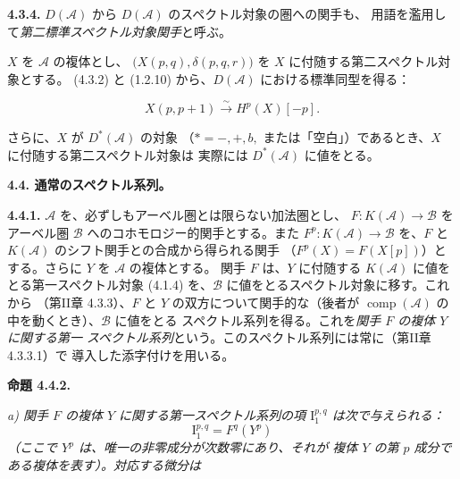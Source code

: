 \clearpage
{}%
\begingroup\small\setlength{\parskip}{0pt}\setlength{\emergencystretch}{1.5em}
\setlength{\abovedisplayskip}{4pt plus 2pt minus 2pt}%
\setlength{\belowdisplayskip}{4pt plus 2pt minus 2pt}%

\noindent\textbf{4.3.4.}\quad
$D(\mathcal A)$ から $D(\mathcal A)$ のスペクトル対象の圏への関手も、
用語を濫用して\emph{第二標準スペクトル対象関手}と呼ぶ。

$X$ を $\mathcal A$ の複体とし、
$\bigl(X(p,q),\delta(p,q,r)\bigr)$ を $X$ に付随する第二スペクトル対象とする。
(4.3.2) と (1.2.10) から、$D(\mathcal A)$ における標準同型を得る：

\begin{equation}
X(p,p+1)\xrightarrow{\sim}H^p(X)[-p].
\tag{4.3.4.1}
\end{equation}

さらに、$X$ が $D^*(\mathcal A)$ の対象
（$*=-,+,b,$ または「空白」）であるとき、$X$ に付随する第二スペクトル対象は
実際には $D^*(\mathcal A)$ に値をとる。

\medskip\noindent\textbf{4.4. 通常のスペクトル系列。}

\noindent\textbf{4.4.1.}\quad
$\mathcal A$ を、必ずしもアーベル圏とは限らない加法圏とし、
$F\colon K(\mathcal A)\longrightarrow\mathcal B$ をアーベル圏
$\mathcal B$ へのコホモロジー的関手とする。また
$F^p\colon K(\mathcal A)\longrightarrow\mathcal B$ を、$F$ と
$K(\mathcal A)$ のシフト関手との合成から得られる関手
（$F^p(X)=F(X[p])$）とする。さらに $Y$ を $\mathcal A$ の複体とする。
関手 $F$ は、$Y$ に付随する $K(\mathcal A)$ に値をとる第一スペクトル対象
(4.1.4) を、$\mathcal B$ に値をとるスペクトル対象に移す。これから
（第II章 4.3.3）、$F$ と $Y$ の双方について関手的な（後者が
$\operatorname{comp}(\mathcal A)$ の中を動くとき）、$\mathcal B$ に値をとる
スペクトル系列を得る。これを\emph{関手 $F$ の複体 $Y$ に関する第一
スペクトル系列}という。このスペクトル系列には常に（第II章 4.3.3.1）で
導入した添字付けを用いる。

\medskip\noindent\textbf{命題 4.4.2.}\quad

\noindent\textit{a) 関手 $F$ の複体 $Y$ に関する第一スペクトル系列の項
$\mathrm I_1^{p,q}$ は次で与えられる：}
\[
\mathrm I_1^{p,q}=F^q(Y^p)
\]
\noindent\textit{（ここで $Y^p$ は、唯一の非零成分が次数零にあり、それが
複体 $Y$ の第 $p$ 成分である複体を表す）。対応する微分は}

